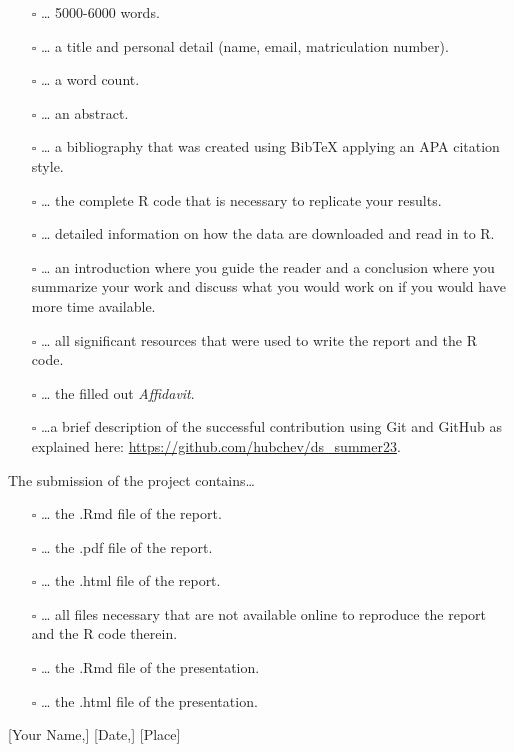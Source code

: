 \documentclass[
  12pt,
]{article}
\providecommand{\tightlist}{%
  \setlength{\itemsep}{0pt}\setlength{\parskip}{0pt}}
\begin{document}
\begin{itemize}
\item[$\square$]
  \ldots{} 5000-6000 words.
\item[$\square$]
  \ldots{} a title and personal detail (name, email, matriculation
  number).
\item[$\square$]
  \ldots{} a word count.
\item[$\square$]
  \ldots{} an abstract.
\item[$\square$]
  \ldots{} a bibliography that was created using BibTeX applying an APA
  citation style.
\item[$\square$]
  \ldots{} the complete R code that is necessary to replicate your
  results.
\item[$\square$]
  \ldots{} detailed information on how the data are downloaded and read
  in to R.
\item[$\square$]
  \ldots{} an introduction where you guide the reader and a conclusion
  where you summarize your work and discuss what you would work on if
  you would have more time available.
\item[$\square$]
  \ldots{} all significant resources that were used to write the report
  and the R code.
\item[$\square$]
  \ldots{} the filled out \emph{Affidavit}.
\item[$\square$]
  \ldots a brief description of the successful contribution using Git and GitHub as explained here: \url{https://github.com/hubchev/ds_summer23}.
\end{itemize}

The submission of the project contains\ldots{}

\begin{itemize}
\tightlist
\item[$\square$]
  \ldots{} the .Rmd file of the
  report.
\item[$\square$]
  \ldots{} the .pdf file of the report.
\item[$\square$]
  \ldots{} the .html file of the report.
\item[$\square$]
  \ldots{} all files necessary that are not available online to reproduce the report and the R code therein.
\item[$\square$]
  \ldots{} the .Rmd file of the presentation.
\item[$\square$]
  \ldots{} the .html file of the presentation.
\end{itemize}

{[}Your Name,{]} {[}Date,{]} {[}Place{]}
\end{document}
